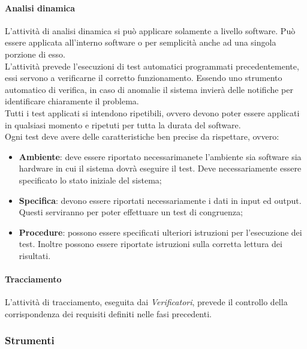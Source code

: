			\paragraph{Analisi dinamica} %
			\label{par:analisi_dinamica}
			L'attività di analisi dinamica si può applicare solamente a livello software. Può essere applicata all'interno software o per semplicità anche ad una singola porzione di esso.\\
			L'attività prevede l'esecuzioni di test automatici programmati precedentemente, essi servono a verificarne il corretto funzionamento. Essendo uno strumento automatico di verifica, in caso di anomalie il sistema invierà delle notifiche per identificare chiaramente il problema.\\
			Tutti i test applicati si intendono ripetibili, ovvero devono poter essere applicati in qualsiasi momento e ripetuti per tutta la durata del software.\\
			Ogni test deve avere delle caratteristiche ben precise da rispettare, ovvero:
			\begin{itemize}
				\item \textbf{Ambiente}: deve essere riportato necessarimanete l'ambiente sia software sia hardware in cui il sistema dovrà eseguire il test. Deve necessariamente essere specificato lo stato iniziale del sistema;
				\item \textbf{Specifica}: devono essere riportati necessariamente i dati in input ed output. Questi serviranno per poter effettuare un test di congruenza;
				\item \textbf{Procedure}: possono essere specificati ulteriori istruzioni per l'esecuzione dei test. Inoltre possono essere riportate istruzioni sulla corretta lettura dei risultati.
			\end{itemize}

			\paragraph{Tracciamento} %
			\label{par:tracciamento}
			L'attività di tracciamento, eseguita dai \emph{Verificatori}, prevede il controllo della corrispondenza dei requisiti definiti nelle fasi precedenti.

			
		\subsubsection{Strumenti} %
		\label{ssub:strumenti}
